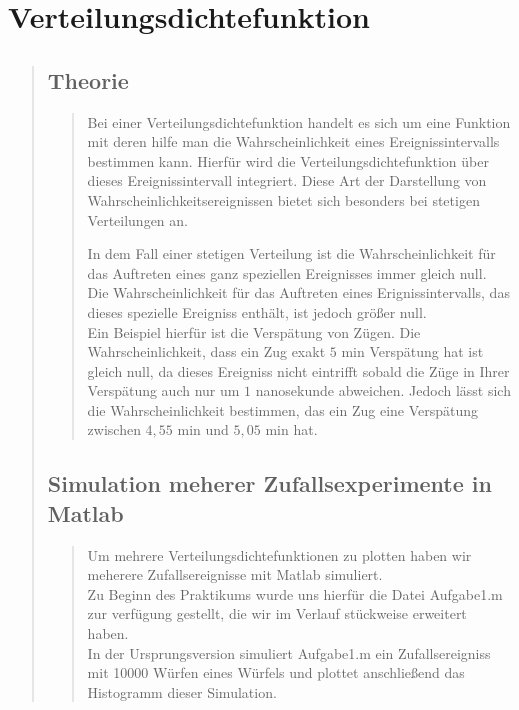 \section{Verteilungsdichtefunktion}
\begin{quote}
	
	\subsection{Theorie}
    \begin{quote}
        Bei einer Verteilungsdichtefunktion handelt es sich um eine Funktion mit deren hilfe man die Wahrscheinlichkeit
        eines Ereignissintervalls bestimmen kann. Hierfür wird die Verteilungsdichtefunktion über dieses
        Ereignissintervall integriert. Diese Art der Darstellung von Wahrscheinlichkeitsereignissen bietet sich
        besonders bei stetigen Verteilungen an.\vspace{1em}
        
        In dem Fall einer stetigen Verteilung ist die Wahrscheinlichkeit für das Auftreten eines ganz speziellen
        Ereignisses immer gleich null. Die Wahrscheinlichkeit für das Auftreten eines Erignissintervalls, das dieses
        spezielle Ereigniss enthält, ist jedoch größer null.\\
        Ein Beispiel hierfür ist die Verspätung von Zügen. Die Wahrscheinlichkeit, dass ein Zug exakt $5$ min Verspätung
        hat ist gleich null, da dieses Ereigniss nicht eintrifft sobald die Züge in Ihrer Verspätung auch nur um $1$
        nanosekunde abweichen. Jedoch lässt sich die Wahrscheinlichkeit bestimmen, das ein Zug eine Verspätung zwischen
        $4,55$ min und $5,05$ min hat.\vspace{1em}
        
    \end{quote}
	
	\subsection{Simulation meherer Zufallsexperimente in Matlab}
    \begin{quote}
        Um mehrere Verteilungsdichtefunktionen zu plotten haben wir meherere Zufallsereignisse mit Matlab simuliert.\\
        Zu Beginn des Praktikums wurde uns hierfür die Datei Aufgabe1.m zur verfügung gestellt, die wir im Verlauf
        stückweise erweitert haben.\\
        In der Ursprungsversion simuliert Aufgabe1.m ein Zufallsereigniss mit 10000 Würfen eines Würfels und plottet
        anschließend das Histogramm dieser Simulation.\\

\end{quote}
\end{quote}
